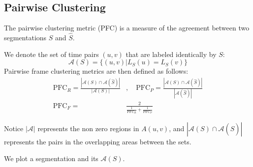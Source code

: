 


\subsection{Pairwise Clustering}
The pairwise clustering metric (PFC) is a measure of the agreement between two segmentations $S$ and $\hat{S}$.

We denote the set of time pairs $(u, v)$ that are labeled identically by $S$: 
$$\mathcal{A}(S)= \{(u, v)|L_S(u)=L_S(v)\}$$
Pairwise frame clustering metrics are then defined as follows: 
\begin{align*}
\text{PFC}_R = \frac{|\mathcal{A}(S) \cap \mathcal{A}(\hat{S})|}{|\mathcal{A}(S)|}&, \quad
\text{PFC}_P = \frac{|\mathcal{A}(S) \cap \mathcal{A}(\hat{S})|}{|\mathcal{A}(\hat{S})|} \\
\text{PFC}_F = &\frac{2}{\frac1{\text{PFC}_R} + \frac1{\text{PFC}_P}}
\end{align*}

Notice $|\mathcal{A}|$ represents the non zero regions in $A(u, v)$, and $|\mathcal{A}(S) \cap \mathcal{A}(\hat{S})|$ represents the pairs in the overlapping areas between the sets.

We plot a segmentation and its $\mathcal{A}(S)$.

